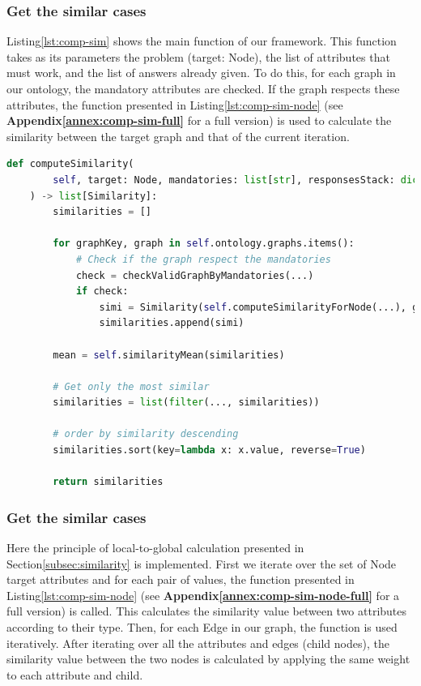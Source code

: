 \subsubsection{Get the similar cases}
Listing\ref{lst:comp-sim} shows the main function of our framework. This function takes as its parameters the problem (target: Node), the list of attributes that must work, and the list of answers already given. To do this, for each graph in our ontology, the mandatory attributes are checked. If the graph respects these attributes, the function presented in Listing\ref{lst:comp-sim-node} (see \textbf{Appendix\ref{annex:comp-sim-full}} for a full version) is used to calculate the similarity between the target graph and that of the current iteration.\\


\begin{lstlisting}[language=Python, caption=Function to find the similarity between one case and all the cases in the data-base, label={lst:comp-sim}]
def computeSimilarity(
        self, target: Node, mandatories: list[str], responsesStack: dict[str, Any]
    ) -> list[Similarity]:
        similarities = []

        for graphKey, graph in self.ontology.graphs.items():
            # Check if the graph respect the mandatories
            check = checkValidGraphByMandatories(...)
            if check:
                simi = Similarity(self.computeSimilarityForNode(...), graph)
                similarities.append(simi)

        mean = self.similarityMean(similarities)

        # Get only the most similar
        similarities = list(filter(..., similarities))

        # order by similarity descending
        similarities.sort(key=lambda x: x.value, reverse=True)

        return similarities
\end{lstlisting}
    
    
    
\subsubsection{Get the similar cases} 
Here the principle of local-to-global calculation presented in Section\ref{subsec:similarity} is implemented. First we iterate over the set of Node target attributes and for each pair of values, the function presented in Listing\ref{lst:comp-sim-node} (see \textbf{Appendix\ref{annex:comp-sim-node-full}} for a full version) is called. This calculates the similarity value between two attributes according to their type. Then, for each Edge in our graph, the function is used iteratively.
After iterating over all the attributes and edges (child nodes), the similarity value between the two nodes is calculated by applying the same weight to each attribute and child.\\

